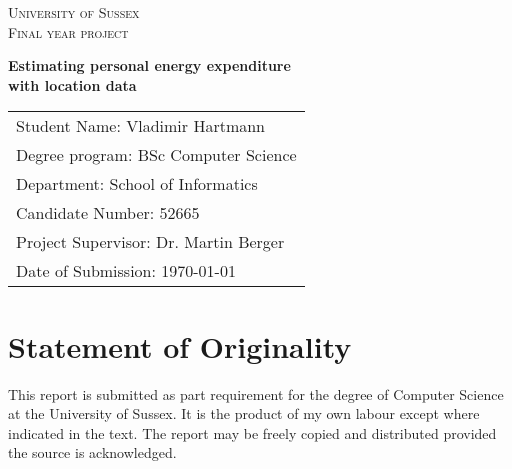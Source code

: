 \documentclass[12pt, a4paper]{report}   %
\begin{document}
\begin{center}

\textsc{\large University of Sussex}\\[1.5cm]
\textsc{Final year project}\\[2cm]

\begin{spacing}{2.5}
{\Large \bfseries Estimating personal energy expenditure \\ with location data}\\[5 cm]
\end{spacing}
\end{center}
\vfill


\begin{spacing}{1.5}
\begin{tabular}{l}
Student Name: Vladimir Hartmann \\
Degree program: BSc Computer Science \\
Department: School of Informatics \\
Candidate Number: 52665 \\
Project Supervisor: Dr. Martin Berger \\
Date of Submission: {\today}
\end{tabular}
\end{spacing}
\thispagestyle{empty}


\clearpage
{}
\section*{Statement of Originality}
This report is submitted as part requirement for the degree of Computer Science at the University of Sussex. It is the product of my own labour except where indicated in the text. The report may be freely copied and distributed provided the source is acknowledged.


\clearpage
\end{document}
